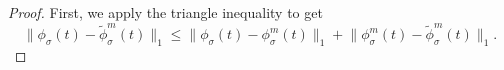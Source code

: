 \begin{proof}
     First, we apply the triangle inequality to get
    \begin{equation}
        \lVert \phi_{\sigma}(t) - \widetilde{\phi}_{\sigma}^m(t) \rVert _1
            \leq \lVert \phi_{\sigma}(t) - \phi_{\sigma}^m(t) \rVert _1 + \lVert \phi_{\sigma}^m(t) - \widetilde{\phi}_{\sigma}^m(t) \rVert _1.
    \end{equation}


\end{proof}
